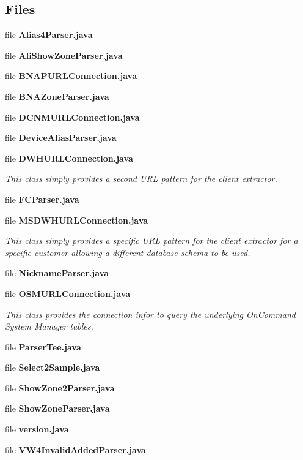 \subsection*{Files}
\begin{DoxyCompactItemize}
\item 
file {\bf Alias4\+Parser.\+java}
\item 
file {\bf Ali\+Show\+Zone\+Parser.\+java}
\item 
file {\bf B\+N\+A\+P\+U\+R\+L\+Connection.\+java}
\item 
file {\bf B\+N\+A\+Zone\+Parser.\+java}
\item 
file {\bf D\+C\+N\+M\+U\+R\+L\+Connection.\+java}
\item 
file {\bf Device\+Alias\+Parser.\+java}
\item 
file {\bf D\+W\+H\+U\+R\+L\+Connection.\+java}
\begin{DoxyCompactList}\small\item\em This class simply provides a second U\+R\+L pattern for the client extractor. \end{DoxyCompactList}\item 
file {\bf F\+C\+Parser.\+java}
\item 
file {\bf M\+S\+D\+W\+H\+U\+R\+L\+Connection.\+java}
\begin{DoxyCompactList}\small\item\em This class simply provides a specific U\+R\+L pattern for the client extractor for a specific customer allowing a different database schema to be used. \end{DoxyCompactList}\item 
file {\bf Nickname\+Parser.\+java}
\item 
file {\bf O\+S\+M\+U\+R\+L\+Connection.\+java}
\begin{DoxyCompactList}\small\item\em This class provides the connection infor to query the underlying On\+Command System Manager tables. \end{DoxyCompactList}\item 
file {\bf Parser\+Tee.\+java}
\item 
file {\bf Select2\+Sample.\+java}
\item 
file {\bf Show\+Zone2\+Parser.\+java}
\item 
file {\bf Show\+Zone\+Parser.\+java}
\item 
file {\bf version.\+java}
\item 
file {\bf V\+W4\+Invalid\+Added\+Parser.\+java}
\item 

\end{DoxyCompactItemize}
